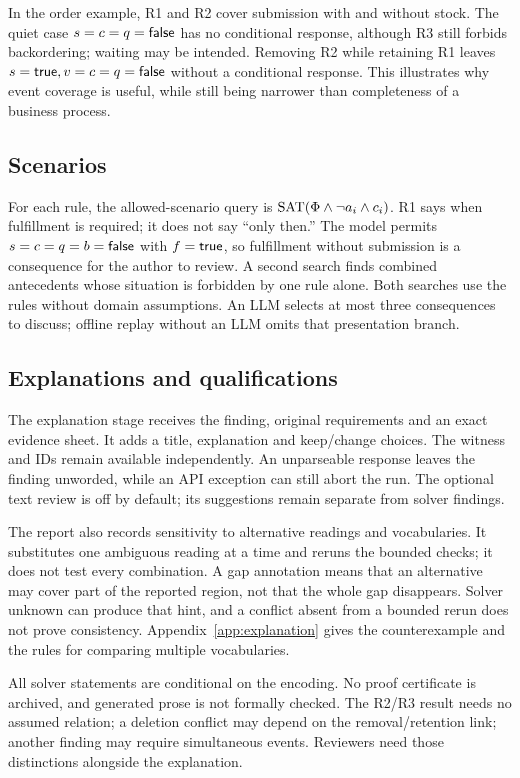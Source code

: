 In the order example, R1 and R2 cover submission with and without stock. The quiet case $s=c=q=\mathsf{false}$ has no conditional response, although R3 still forbids backordering; waiting may be intended. Removing R2 while retaining R1 leaves $s=\mathsf{true},v=c=q=\mathsf{false}$ without a conditional response. This illustrates why event coverage is useful, while still being narrower than completeness of a business process.

\subsection{Scenarios}
For each rule, the allowed-scenario query is $\operatorname{SAT}(\Phi\land\neg a_i\land c_i)$. R1 says when fulfillment is required; it does not say ``only then.'' The model permits $s=c=q=b=\mathsf{false}$ with $f=\mathsf{true}$, so fulfillment without submission is a consequence for the author to review. A second search finds combined antecedents whose situation is forbidden by one rule alone. Both searches use the rules without domain assumptions. An LLM selects at most three consequences to discuss; offline replay without an LLM omits that presentation branch.

\subsection{Explanations and qualifications}\label{sec:explanation}

The explanation stage receives the finding, original requirements and an exact evidence sheet. It adds a title, explanation and keep/change choices. The witness and IDs remain available independently. An unparseable response leaves the finding unworded, while an API exception can still abort the run. The optional text review is off by default; its suggestions remain separate from solver findings.

The report also records sensitivity to alternative readings and vocabularies. It substitutes one ambiguous reading at a time and reruns the bounded checks; it does not test every combination. A gap annotation means that an alternative may cover part of the reported region, not that the whole gap disappears. Solver unknown can produce that hint, and a conflict absent from a bounded rerun does not prove consistency. Appendix~\ref{app:explanation} gives the counterexample and the rules for comparing multiple vocabularies.

All solver statements are conditional on the encoding. No proof certificate is archived, and generated prose is not formally checked. The R2/R3 result needs no assumed relation; a deletion conflict may depend on the removal/retention link; another finding may require simultaneous events. Reviewers need those distinctions alongside the explanation.

